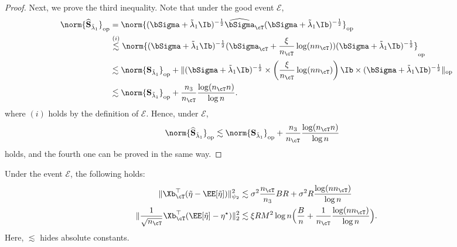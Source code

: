 \documentclass[12pt,a4paper,pdftex,onepage]{article}
\newcommand{\Sighat}{\widehat{{\bSigma}}}
\newcommand{\op}{\operatorname{op}}
\newcommand{\sig}{\sigma}
\newcommand{\Sbar}{\mathbf{S}}
\newcommand{\Shat}{\widehat{\mathbf{S}}}
\newcommand{\event}{\mathscr{E}}
\begin{document}
\begin{proof}
Next, we prove the third inequality. 
Note that under the good event \(\event\),
\begin{align*}
\norm{\Shat_{\tilde{\lambda}_1}}_{\op} &= \norm{ (\bSigma+ \tilde{\lambda}_1 \Ib)^{-\frac{1}{2}} {\Sighat}_\cT (\bSigma+ \tilde{\lambda}_1 \Ib)^{-\frac{1}{2}}  }_{\op} \\
&\stackrel{(i)}{\lesssim }\norm{ (\bSigma+ \tilde{\lambda}_1 \Ib)^{-\frac{1}{2}} (\bSigma_\cT +\frac{\xi}{n_{\cT}}\log(n n_\cT)) (\bSigma+ \tilde{\lambda}_1 \Ib)^{-\frac{1}{2}}  }_{\op} \\
&\lesssim \norm{\Sbar_{\tilde{\lambda}_1}}_{\op} + \|(\bSigma+ \tilde{\lambda}_1 \Ib)^{-\frac{1}{2}} \times \left(\frac{\xi}{n_{\cT}}\log(n n_\cT)\right)\Ib  \times (\bSigma+ \tilde{\lambda}_1 \Ib)^{-\frac{1}{2}}\|_{\op} \\
&\lesssim  \norm{\Sbar_{\tilde{\lambda}_1}}_{\op} + \frac{n_3}{n_{\cT}} \frac{\log (n_\cT n)}{\log n}.
\end{align*}
where $(i)$ holds by the definition of $\event$.
Hence, under \(\event\),
\begin{align*}
&\norm{\Shat_{\tilde{\lambda}_1}}_{\op} \lesssim \norm{\Sbar_{\tilde{\lambda}_1}}_{\op} + \frac{n_3}{n_{\cT}} \frac{\log (n_\cT n)}{\log n} 
\end{align*}
holds, and the fourth one can be proved in the same way.

\end{proof}


\begin{corollary}\label{corollary; test label norm bounds}
Under the event $\event$, the following holds:
\begin{align*}
\|\Xb_\cT^\top (\tilde{\eta}-\EE[\tilde{\eta}]) \|^2_{\psi_2} &\lesssim \sig^2 \frac{n_{\cT}}{n_3} BR +\sig^2R \frac{\log (nn_\cT)}{\log n} \\
\|\frac{1}{\sqrt{n_{\cT}}}\Xb_\cT^\top (\EE[\tilde{\eta}] -\eta^\star) \|^2_{2}  &\lesssim \xi RM^2 \log n \Bigl(\frac{B}{n} +\frac{1}{n_{\cT}}\frac{\log (nn_\cT)}{\log n}\Bigr).
\end{align*}
Here, \(\lesssim\) hides absolute constants.
\end{corollary}
\end{document}

